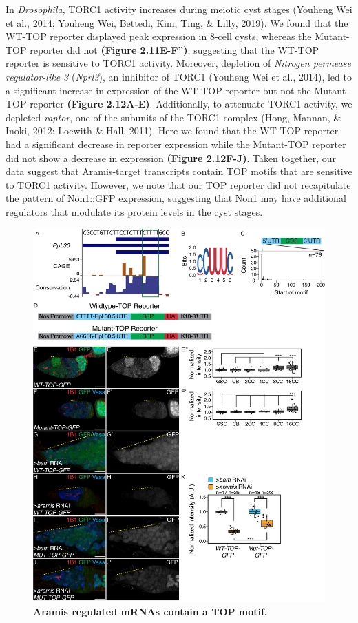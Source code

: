 \documentclass[12pt,oneside]{reedthesis}
\begin{document}
In \emph{Drosophila}, TORC1 activity increases during meiotic cyst stages (Youheng Wei et al., 2014; Youheng Wei, Bettedi, Kim, Ting, \& Lilly, 2019). We found that the WT-TOP reporter displayed peak expression in 8-cell cysts, whereas the Mutant-TOP reporter did not \textbf{(Figure 2.11E-F'')}, suggesting that the WT-TOP reporter is sensitive to TORC1 activity. Moreover, depletion of \emph{Nitrogen permease regulator-like 3} (\emph{Nprl3}), an inhibitor of TORC1 (Youheng Wei et al., 2014), led to a significant increase in expression of the WT-TOP reporter but not the Mutant-TOP reporter \textbf{(Figure 2.12A-E)}. Additionally, to attenuate TORC1 activity, we depleted \emph{raptor}, one of the subunits of the TORC1 complex (Hong, Mannan, \& Inoki, 2012; Loewith \& Hall, 2011). Here we found that the WT-TOP reporter had a significant decrease in reporter expression while the Mutant-TOP reporter did not show a decrease in expression \textbf{(Figure 2.12F-J)}. Taken together, our data suggest that Aramis-target transcripts contain TOP motifs that are sensitive to TORC1 activity. However, we note that our TOP reporter did not recapitulate the pattern of Non1::GFP expression, suggesting that Non1 may have additional regulators that modulate its protein levels in the cyst stages.
\begin{figure}

{\centering \includegraphics[width=1\linewidth]{./figure/Ribosome Biogenesis/Ribosome Biogenesis 6} 

}

\caption[\textbf{Aramis regulated mRNAs contain a TOP motif.}]{\textbf{Aramis regulated mRNAs contain a TOP motif.}}\label{fig:unnamed-chunk-18}
\end{figure}
\end{document}
